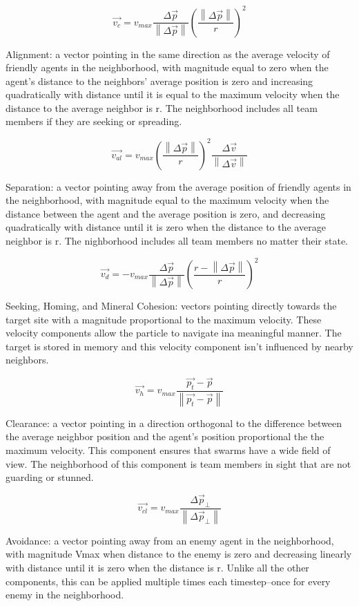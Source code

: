 \documentclass[12pt,journal,compsoc]{IEEEtran}
\begin{document}
\[ \vec { v_{ c } } =v_{ max }\frac { \Delta  \vec { p }  }{ \left\|   \Delta \vec { p }  \right\|  } \left( \frac { \left\|  \Delta \vec {  p }  \right\|  }{ r }  \right) ^{ 2 } \]

Alignment: a vector pointing in the same direction as the average velocity of friendly agents in the neighborhood, with magnitude equal to zero when the agent's distance to the neighbors' average position is zero and increasing quadratically with distance until it is equal to the maximum velocity when the distance to the average neighbor is r. The neighborhood includes all team members if they are seeking or spreading.

\[ \vec { v_{ al } } =v_{ max }{\left( \frac { \left\| \Delta \vec { p } \right\|  }{ r }  \right)}^2\frac {\Delta \vec{v}} { \left\| \Delta \vec{v} \right\| } \]

Separation: a vector pointing away from the average position of friendly agents in the neighborhood, with magnitude equal to the maximum velocity when the distance between the agent and the average position is zero, and decreasing quadratically with distance until it is zero when the distance to the average neighbor is r. The nighborhood includes all team members no matter their state.

\[ \vec { v_{ d } } =-v_{ max }\frac {\Delta \vec{p}} { \left\| \Delta \vec{p} \right\| }{\left( \frac { r - \left\| \Delta \vec { p } \right\|  }{ r }  \right)}^2 \]

Seeking, Homing, and Mineral Cohesion: vectors pointing directly towards the target site with a magnitude proportional to the maximum velocity. These velocity components allow the particle to navigate ina  meaningful manner. The target is stored in memory and this velocity component isn't influenced by nearby neighbors.

\[ \vec{v_h} = v_{max} \frac {\vec{p_t} - \vec p} { \left\| \vec{p_t} - \vec p \right\| } \]

Clearance: a vector pointing in a direction orthogonal to the difference between the average neighbor position and the agent's position proportional the the maximum velocity. This component ensures that swarms have a wide field of view. The neighborhood of this component is team members in sight that are not guarding or stunned.

\[ \vec{v_{cl}} = v_{max} \frac {\Delta \vec p_\perp } { \left\| \Delta \vec p_\perp  \right\| }  \]

Avoidance: a vector pointing away from an enemy agent in the neighborhood, with magnitude Vmax when distance to the enemy is zero and decreasing linearly with distance until it is zero when the distance is r. Unlike all the other components, this can be applied multiple times each timestep--once for every enemy in the neighborhood.
\end{document}
